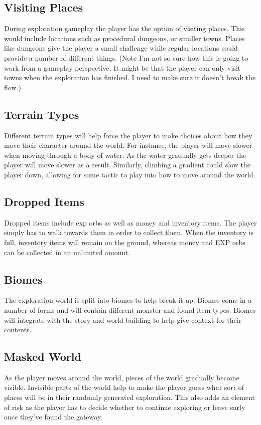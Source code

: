\documentclass[a4paper]{scrreprt}
\begin{document}
\subsection{Visiting Places}
During exploration gameplay the player has the option of visiting places.
This would include locations such as procedural dungeons, or smaller towns.
Places like dungeons give the player a small challenge while regular locations could provide a number of different things.
(Note I'm not so sure how this is going to work from a gameplay perspective.
It might be that the player can only visit towns when the exploration has finished.
I need to make sure it doesn't break the flow.)

\subsection{Terrain Types}
Different terrain types will help force the player to make choices about how they move their character around the world.
For instance, the player will move slower when moving through a body of water.
As the water gradually gets deeper the player will move slower as a result.
Similarly, climbing a gradient could slow the player down, allowing for some tactic to play into how to move around the world.

\subsection{Dropped Items}
Dropped items include exp orbs as well as money and inventory items.
The player simply has to walk towards them in order to collect them.
When the inventory is full, inventory items will remain on the ground, whereas money and EXP orbs can be collected in an unlimited amount.

\subsection{Biomes}
The exploration world is split into biomes to help break it up.
Biomes come in a number of forms and will contain different monster and found item types.
Biomes will integrate with the story and world building to help give context for their contents.

\subsection{Masked World}
As the player moves around the world, pieces of the world gradually become visible.
Invisible parts of the world help to make the player guess what sort of places will be in their randomly generated exploration.
This also adds an element of risk as the player has to decide whether to continue exploring or leave early once they've found the gateway.
\end{document}
